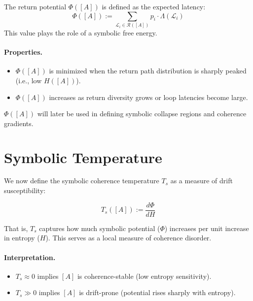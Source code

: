 \begin{definition} \label{def:return-potential}
The return potential $\Phi([A])$ is defined as the expected latency:
\begin{equation} \label{eq:return-potential}
\Phi([A]) := \sum_{\mathcal{L}_i \in \mathcal{R}([A])} p_i \cdot \Lambda(\mathcal{L}_i)
\end{equation}
This value plays the role of a symbolic free energy.
\end{definition}

\paragraph{Properties.}
\begin{itemize}
    \item $\Phi([A])$ is minimized when the return path distribution is sharply peaked (i.e., low $H([A])$).
    \item $\Phi([A])$ increases as return diversity grows or loop latencies become large.
\end{itemize}

$\Phi([A])$ will later be used in defining symbolic collapse regions and coherence gradients.

\section{Symbolic Temperature} \label{symbolic-temperature}

We now define the symbolic coherence temperature $T_s$ as a measure of drift susceptibility:

\begin{equation} \label{eq:symbolic-temperature}
T_s([A]) := \frac{d\Phi}{dH}
\end{equation}

That is, $T_s$ captures how much symbolic potential ($\Phi$) increases per unit increase in entropy ($H$). This serves as a local measure of coherence disorder.

\paragraph{Interpretation.}
\begin{itemize}
    \item $T_s \approx 0$ implies $[A]$ is coherence-stable (low entropy sensitivity).
    \item $T_s \gg 0$ implies $[A]$ is drift-prone (potential rises sharply with entropy).
\end{itemize}

